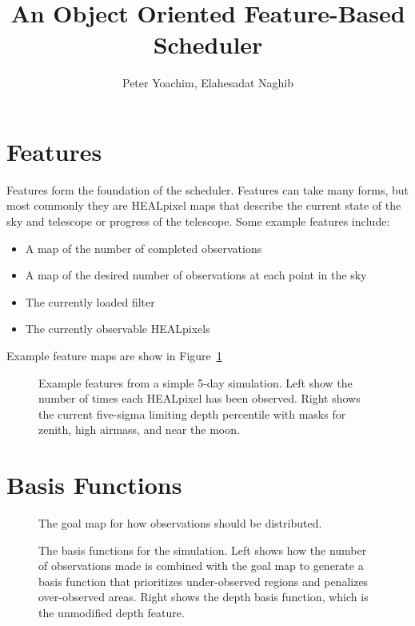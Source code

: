 \documentclass[12pt,preprint]{aastex}
\begin{document}
\title{An Object Oriented Feature-Based Scheduler}


\author{Peter Yoachim, Elahesadat Naghib}

\section{Features}
Features form the foundation of the scheduler. Features can take many forms, but most commonly they are HEALpixel maps that describe the current state of the sky and telescope or progress of the telescope. Some example features include:
\begin{itemize}
    \item{A map of the number of completed observations}
    \item{A map of the desired number of observations at each point in the sky}
    \item{The currently loaded filter}
    \item{The currently observable HEALpixels}
\end{itemize}
Example feature maps are show in Figure~\ref{features}

\begin{figure}
\caption{Example features from a simple 5-day simulation. Left show the number of times each HEALpixel has been observed. Right shows the current five-sigma limiting depth percentile with masks for zenith, high airmass, and near the moon. \label{features}}
\end{figure}


\section{Basis Functions}


\begin{figure}
\caption{The goal map for how observations should be distributed. \label{goal}}
\end{figure}


\begin{figure}
\caption{The basis functions for the simulation. Left shows how the number of observations made is combined with the goal map to generate a basis function that prioritizes under-observed regions and penalizes over-observed areas. Right shows the depth basis function, which is the unmodified depth feature.\label{basis_funcs}}
\end{figure}
\end{document}
